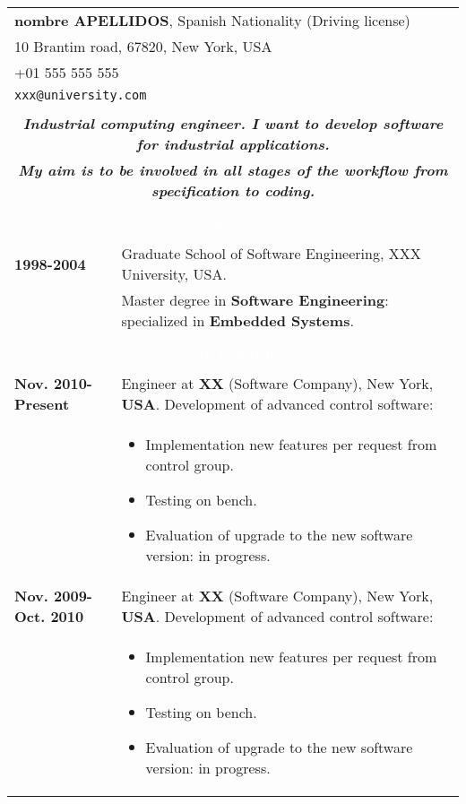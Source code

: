 \documentclass[twoside,a4paper,openright,10pt]{report}
\begin{document}
\begin{table}[ht]
\centering
\begin{tabular}{p{40mm} p{140mm}}

\multicolumn{2}{l}{\textbf{nombre APELLIDOS}, Spanish Nationality (Driving license)}\\
\multicolumn{2}{l}{10 Brantim road, 67820, New York, USA}\\
\multicolumn{2}{l}{+01 555 555 555}\\
\multicolumn{2}{l}{\texttt{xxx@university.com}}\\ \\
\multicolumn{2}{c}{\textbf{\textit{\large Industrial computing engineer. I want to develop software for industrial applications.}}}\\
\multicolumn{2}{c}{\textbf{\textit{\large My aim is to be involved in all stages of the workflow from specification to coding.}}}\\ \\

\multicolumn{2}{c}{\cellcolor{black} \textcolor{white}{Education}}\\ \\

\textbf{1998-2004} & Graduate School of Software Engineering, XXX University, USA.\\
 & Master degree in \textbf{Software Engineering}: specialized in \textbf{Embedded Systems}.\\
\\

\multicolumn{2}{c}{\cellcolor{black} \textcolor{white}{Work Experience}}\\ \\
\textbf{Nov. 2010-Present} & Engineer at \textbf{XX} (Software Company), New York, \textbf{USA}. Development of advanced control software:\\
& \vspace{-2mm} \begin{itemize}[noitemsep,nolistsep]
\item Implementation new features per request from control group.
\item Testing on bench.
\item Evaluation of upgrade to the new software version: in progress.
\vspace{-4mm}
\end{itemize}\\

\textbf{Nov. 2009-Oct. 2010} & Engineer at \textbf{XX} (Software Company), New York, \textbf{USA}. Development of advanced control software:\\
& \vspace{-2mm} \begin{itemize}[noitemsep,nolistsep]
\item Implementation new features per request from control group.
\item Testing on bench.
\item Evaluation of upgrade to the new software version: in progress.
\vspace{-4mm}
\end{itemize}\\


\end{tabular}
\end{table}
\end{document}
